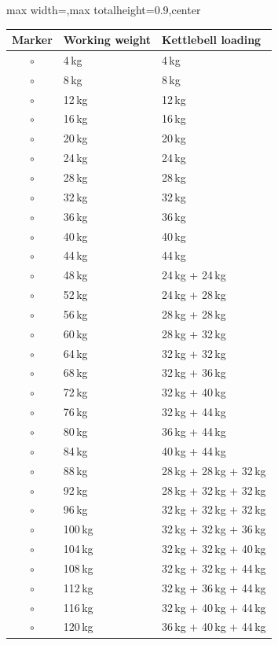 \documentclass[11pt,a4paper]{article}
\newcommand{\tablearraystretch}{1.15}
\begin{document}
\begin{center}
\renewcommand{\arraystretch}{\tablearraystretch}
\begin{adjustbox}{max width=\linewidth,max totalheight=0.9\textheight,center}
\begin{tabular}{cll}
\toprule
Marker & Working weight & Kettlebell loading \\
\midrule
$\circ$ & 4\,kg & 4\,kg \\
$\circ$ & 8\,kg & 8\,kg \\
$\circ$ & 12\,kg & 12\,kg \\
$\circ$ & 16\,kg & 16\,kg \\
$\circ$ & 20\,kg & 20\,kg \\
$\circ$ & 24\,kg & 24\,kg \\
$\circ$ & 28\,kg & 28\,kg \\
$\circ$ & 32\,kg & 32\,kg \\
$\circ$ & 36\,kg & 36\,kg \\
$\circ$ & 40\,kg & 40\,kg \\
$\circ$ & 44\,kg & 44\,kg \\
$\circ$ & 48\,kg & 24\,kg + 24\,kg \\
$\circ$ & 52\,kg & 24\,kg + 28\,kg \\
$\circ$ & 56\,kg & 28\,kg + 28\,kg \\
$\circ$ & 60\,kg & 28\,kg + 32\,kg \\
$\circ$ & 64\,kg & 32\,kg + 32\,kg \\
$\circ$ & 68\,kg & 32\,kg + 36\,kg \\
$\circ$ & 72\,kg & 32\,kg + 40\,kg \\
$\circ$ & 76\,kg & 32\,kg + 44\,kg \\
$\circ$ & 80\,kg & 36\,kg + 44\,kg \\
$\circ$ & 84\,kg & 40\,kg + 44\,kg \\
$\circ$ & 88\,kg & 28\,kg + 28\,kg + 32\,kg \\
$\circ$ & 92\,kg & 28\,kg + 32\,kg + 32\,kg \\
$\circ$ & 96\,kg & 32\,kg + 32\,kg + 32\,kg \\
$\circ$ & 100\,kg & 32\,kg + 32\,kg + 36\,kg \\
$\circ$ & 104\,kg & 32\,kg + 32\,kg + 40\,kg \\
$\circ$ & 108\,kg & 32\,kg + 32\,kg + 44\,kg \\
$\circ$ & 112\,kg & 32\,kg + 36\,kg + 44\,kg \\
$\circ$ & 116\,kg & 32\,kg + 40\,kg + 44\,kg \\
$\circ$ & 120\,kg & 36\,kg + 40\,kg + 44\,kg \\
\bottomrule
\end{tabular}
\end{adjustbox}
\renewcommand{\arraystretch}{1}
\end{center}
\end{document}
